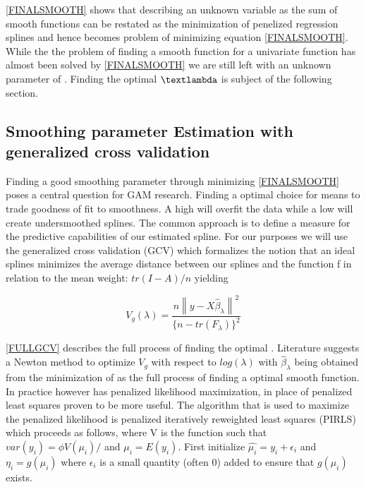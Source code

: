 \documentclass{article}
\begin{document}
    \ref{FINALSMOOTH} shows that describing an unknown variable as the sum of smooth functions can be restated as the minimization of penelized regression splines and hence becomes problem of minimizing equation \ref{FINALSMOOTH}. While the the problem of finding a smooth function for a univariate function has almost been solved by \ref{FINALSMOOTH} we are still left with an unknown parameter of \textlambda. Finding the optimal $\textlambda$ is subject of the following section.

    \subsection{Smoothing parameter Estimation with generalized cross validation}
    Finding a good smoothing parameter through minimizing \ref{FINALSMOOTH} poses a central question for GAM research. Finding a optimal choice for \textlambda means to trade goodness of fit to smoothness. A high \textlambda will overfit the data while a low \textlambda will create undersmoothed splines. The common approach is to define a measure for the predictive capabilities of our estimated spline. For our purposes we will use the generalized cross validation (GCV) which formalizes the notion that an ideal splines minimizes the average distance between our splines and the function f in relation to the mean weight: $tr(I-A)/n$ yielding

    \begin{equation} \label{FULLGCV} V_g(\lambda) = \frac{n\left \| y-X\widehat{\beta}_\lambda \right \| ^2}{\{n-tr(F_\lambda) \}^2} \end{equation}

    \ref{FULLGCV} describes the full process of finding the optimal \textlambda.  Literature suggests a Newton method to optimize $V_g$ with respect to $log(\lambda)$ with $\widehat{\beta}_\lambda$ being obtained from the minimization of \label{FINALSMOOTH} as the full process of finding a optimal smooth function. In practice however has penalized likelihood maximization, in place of penalized least squares proven to be more useful. The algorithm that is used to maximize the penalized likelihood is penalized iteratively reweighted least squares (PIRLS) which proceeds as follows, where V is the function such that $var(y_i) = \phi V(\mu_i)/$ and $\mu_i = E(y_i)$. First initialize $\widehat{\mu_i} = y_i + \epsilon_i $ and $\eta_i = g(\mu_i)$ where $\epsilon_i$ is a small quantity (often 0) added to ensure that $g(\mu_i)$ exists.
\end{document}
